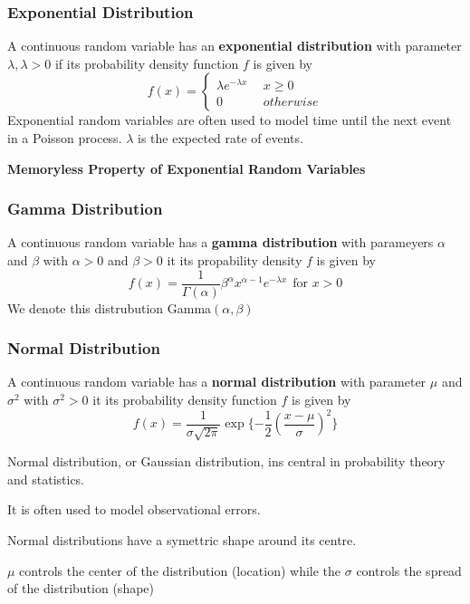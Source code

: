 \documentclass{article}
\begin{document}
\subsubsection{Exponential Distribution}
\begin{definition}
A continuous random variable has an \textbf{exponential distribution} with parameter $\lambda, \lambda > 0$ if its probability density function $f$ is given by\\
\begin{equation}
f(x) =
\begin{cases}
\lambda e^{-\lambda x} \ \ &x \geq 0\\
0 \ \ &otherwise
\end{cases}
\end{equation}
Exponential random variables are often used to model time until the next event in a Poisson process. $\lambda$ is the expected rate of events.
\end{definition}
\textbf{Memoryless Property of Exponential Random Variables}
\subsubsection{Gamma Distribution}
\begin{definition}
A continuous random variable has a \textbf{gamma distribution} with parameyers $\alpha$ and $\beta$ with $\alpha > 0$ and $\beta > 0 $ it its propability density $f$ is given by
\begin{equation}
f(x) = \frac{1}{\Gamma(\alpha)} \beta^\alpha x^{\alpha -1} e^{-\lambda x} \ \ \text{for $x > 0$}
\end{equation}
We denote this distrubution Gamma$(\alpha, \beta)$
\end{definition}
\subsubsection{Normal Distribution}
\begin{definition}
A continuous random variable has a \textbf{normal distribution} with parameter $\mu$ and $\sigma^2$ with $\sigma^2 > 0$ it its probability density function $f$ is given by
\begin{equation}
f(x) = \frac{1}{\sigma \sqrt{2\pi}}\exp\{-\frac{1}{2}(\frac{x-\mu}{\sigma})^2\}
\end{equation}
\end{definition}
\par Normal distribution, or Gaussian distribution, ins central in probability theory and statistics.\\
\par It is often used to model observational errors.\\
\par Normal distributions have a symettric shape around its centre.\\
\par $\mu$ controls the center of the distribution (location) while the $\sigma$ controls the spread of the distribution (shape)\\
\end{document}
